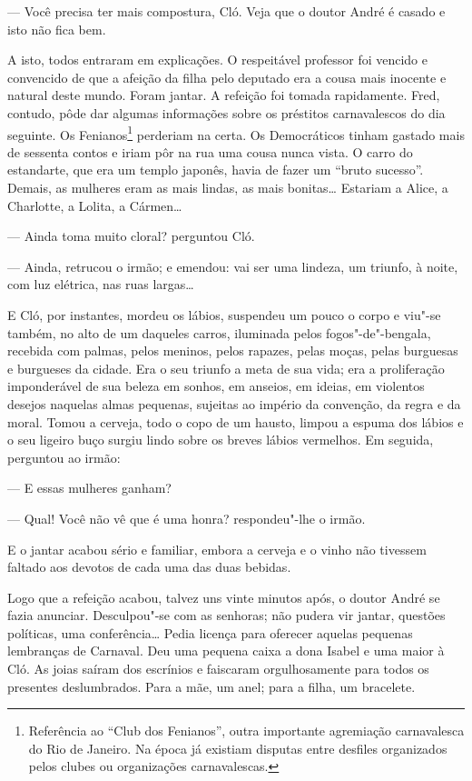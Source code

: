 --- Você precisa ter mais compostura, Cló. Veja que o doutor André é
casado e isto não fica bem.

A isto, todos entraram em explicações. O respeitável professor foi
vencido e convencido de que a afeição da filha pelo deputado era a cousa
mais inocente e natural deste mundo. Foram jantar. A refeição foi tomada
rapidamente. Fred, contudo, pôde dar algumas informações sobre os
préstitos carnavalescos do dia seguinte. Os Fenianos\footnote{Referência
  ao ``Club dos Fenianos'', outra importante agremiação carnavalesca do
  Rio de Janeiro. Na época já existiam disputas entre desfiles
  organizados pelos clubes ou organizações carnavalescas.} perderiam na
certa. Os Democráticos tinham gastado mais de sessenta contos e iriam
pôr na rua uma cousa nunca vista. O carro do estandarte, que era um
templo japonês, havia de fazer um ``bruto sucesso''. Demais, as mulheres
eram as mais lindas, as mais bonitas\ldots{} Estariam a Alice, a Charlotte, a
Lolita, a Cármen\ldots{}

--- Ainda toma muito cloral? perguntou Cló.

--- Ainda, retrucou o irmão; e emendou: vai ser uma lindeza, um triunfo,
à noite, com luz elétrica, nas ruas largas\ldots{}

E Cló, por instantes, mordeu os lábios, suspendeu um pouco o corpo e
viu"-se também, no alto de um daqueles carros, iluminada pelos
fogos"-de"-bengala, recebida com palmas, pelos meninos, pelos rapazes,
pelas moças, pelas burguesas e burgueses da cidade. Era o seu triunfo a
meta de sua vida; era a proliferação imponderável de sua beleza em
sonhos, em anseios, em ideias, em violentos desejos naquelas almas
pequenas, sujeitas ao império da convenção, da regra e da moral. Tomou a
cerveja, todo o copo de um hausto, limpou a espuma dos lábios e o seu
ligeiro buço surgiu lindo sobre os breves lábios vermelhos. Em seguida,
perguntou ao irmão:

--- E essas mulheres ganham?

--- Qual! Você não vê que é uma honra? respondeu"-lhe o irmão.

E o jantar acabou sério e familiar, embora a cerveja e o vinho não
tivessem faltado aos devotos de cada uma das duas bebidas.

Logo que a refeição acabou, talvez uns vinte minutos após, o doutor
André se fazia anunciar. Desculpou"-se com as senhoras; não pudera vir
jantar, questões políticas, uma conferência\ldots{} Pedia licença para
oferecer aquelas pequenas lembranças de Carnaval. Deu uma pequena caixa
a dona Isabel e uma maior à Cló. As joias saíram dos escrínios e
faiscaram orgulhosamente para todos os presentes deslumbrados. Para a
mãe, um anel; para a filha, um bracelete.

